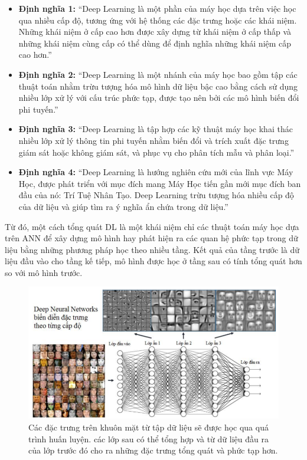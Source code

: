 	\begin{itemize}
		\item \textbf{Định nghĩa 1:} “Deep Learning là một phần của máy học dựa trên việc học qua nhiều cấp độ, tương ứng với hệ thống các đặc trưng hoặc các khái niệm. Những khái niệm ở cấp cao hơn được xây dựng từ khái niệm ở cấp thấp và những khái
niệm cùng cấp có thể dùng để định nghĩa những khái niệm cấp cao hơn.”
		\item \textbf{Định nghĩa 2:} “Deep Learning là một nhánh của máy học bao gồm tập các thuật toán nhằm trừu tượng hóa mô hình dữ liệu bậc cao bằng cách sử dụng nhiều lớp xử lý với cấu trúc phức tạp, được tạo nên bởi các mô hình biến đổi phi tuyến.”
		\item \textbf{Định nghĩa 3:} “Deep Learning là tập hợp các kỹ thuật máy học khai thác nhiều lớp xử lý thông tin phi tuyến nhằm biến đổi và trích xuất đặc trưng giám sát hoặc không giám sát, và phục vụ cho phân tích mẫu và phân loại.”
		\item \textbf{Định nghĩa 4:} “Deep Learning là hướng nghiên cứu mới của lĩnh vực Máy Học, được phát triển với mục đích mang Máy Học tiến gần mới mục đích ban đầu của nó: Trí Tuệ Nhân Tạo. Deep Learning trừu tượng hóa nhiều cấp độ của dữ liệu và giúp tìm ra ý nghĩa ẩn chứa trong dữ liệu.”
	\end{itemize}
	Từ đó, một cách tổng quát DL là một khái niệm chỉ các thuật toán máy học dựa trên ANN để xây dựng mô hình hay phát hiện ra các quan hệ phức tạp trong dữ liệu bằng những phương pháp học theo nhiều tầng. Kết quả của tầng trước là dữ liệu đầu vào cho tầng kế tiếp, mô hình được học ở tầng sau có tính tổng quát hơn so với mô hình trước. \par
\begin{figure}
  			\begin{center}
    				\includegraphics[scale=0.5]{DL1}
    				\caption{Các đặc trưng trên khuôn mặt từ tập dữ liệu sẽ được học qua quá trình huấn luyện. các lớp sau có thể tổng hợp và từ dữ liệu đầu ra của lớp trước đó cho ra những đặc trưng tổng quát và phức tạp hơn.} 
    				\label{DL1}
  			\end{center}
\end{figure}		
